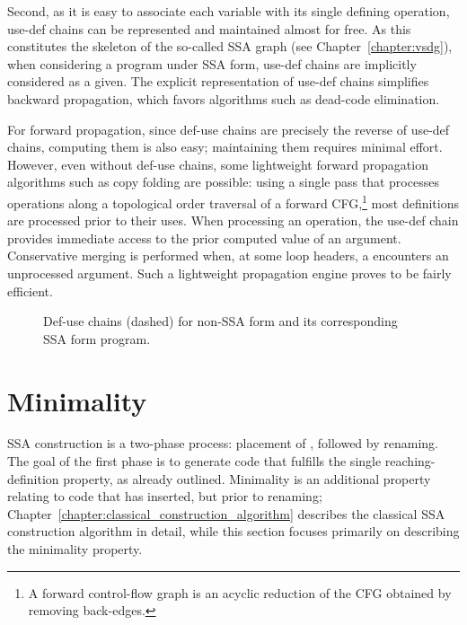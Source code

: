 Second, as it is easy to associate each variable with its single defining operation, use-def chains can be represented and maintained almost for free. 
As this constitutes the skeleton of the so-called SSA graph (see Chapter~\ref{chapter:vsdg}), when considering a program under SSA form, use-def chains are implicitly considered as a given. 
The explicit representation of use-def chains simplifies backward propagation, which favors algorithms such as dead-code elimination.

For forward propagation, since def-use chains are precisely the reverse of use-def chains, computing them is also easy; maintaining them requires minimal effort.
However, even without def-use chains, some lightweight forward propagation algorithms such as copy folding are possible: 
using a single pass that processes operations along a topological order traversal of a forward CFG,\footnote{A forward control-flow graph is an acyclic reduction of the CFG obtained by removing back-edges.} 
most definitions are processed prior to their uses. 
When processing an operation, the use-def chain provides immediate access to the prior computed value of an argument. 
Conservative merging is performed when, at some loop headers, a \phifun encounters an unprocessed argument. 
Such a lightweight propagation engine proves to be fairly efficient.


\begin{figure}
\caption{Def-use chains (dashed) for non-SSA form and its corresponding SSA form program.}
\label{fig:properties_and_flavors:du} 
\end{figure}



\section{Minimality}
\label{sec:properties_and_flavors:minimality}

SSA construction is a two-phase process: 
placement of \phifuns, followed by renaming. 
The goal of the first phase is to generate code that fulfills the single reaching-definition property, as already outlined. 
Minimality is an additional property relating to code that has \phifuns inserted, but prior to renaming; 
Chapter~\ref{chapter:classical_construction_algorithm} describes the classical SSA construction algorithm in detail, while this section focuses primarily on describing the minimality property.

